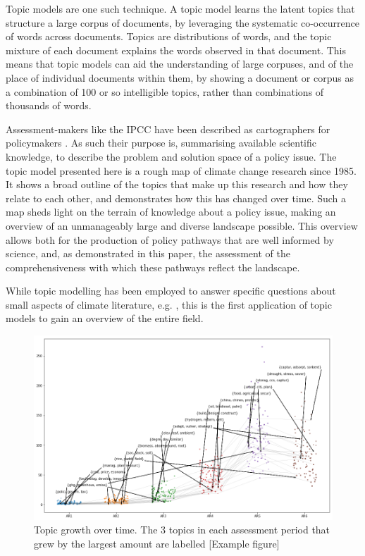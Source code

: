\documentclass{article}
\begin{document}
Topic models are one such technique. A topic model learns the latent topics that structure a large corpus of documents, by leveraging the systematic co-occurrence of words across documents. Topics are distributions of words, and the topic mixture of each document explains the words observed in that document. This means that topic models can aid the understanding of large corpuses, and of the place of individual documents within them, by showing a document or corpus as a combination of 100 or so intelligible topics, rather than combinations of thousands of words.

Assessment-makers like the IPCC have been described as cartographers for policymakers \citep{Edenhofer2015}. As such their purpose is, summarising available scientific knowledge, to describe the problem and solution space of a policy issue. The topic model presented here is a rough map of climate change research since 1985. It shows a broad outline of the topics that make up this research and how they relate to each other, and demonstrates how this has changed over time. Such a map sheds light on the terrain of knowledge about a policy issue, making an overview of an unmanageably large and diverse landscape possible. This overview allows both for the production of policy pathways that are well informed by science, and, as demonstrated in this paper, the assessment of the comprehensiveness with which these pathways reflect the landscape.


While topic modelling has been employed to answer specific questions about small aspects of climate literature, e.g. \citep[e.g.][]{Minx2017FastEmissions, Grubert2016}, this is the first application of topic models to gain an overview of the entire field.







\begin{figure}
	\includegraphics[width=\linewidth]{plots/hot_topics_65}
    \caption{Topic growth over time. The 3 topics in each assessment period that grew by the largest amount are labelled [Example figure]}
    \label{topic_growth}
\end{figure}
\end{document}
